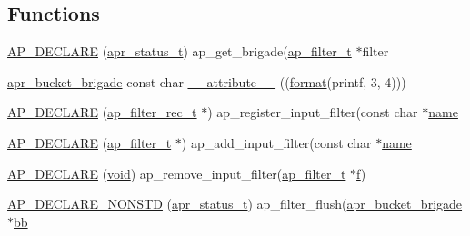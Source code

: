 \subsection*{Functions}
\begin{DoxyCompactItemize}
\item 
\hyperlink{group__APACHE__CORE__FILTER_gacd341cc6652b99c7728a5bda1778427a}{A\+P\+\_\+\+D\+E\+C\+L\+A\+RE} (\hyperlink{group__apr__errno_gaa5105fa83cc322f09382292db8b47593}{apr\+\_\+status\+\_\+t}) ap\+\_\+get\+\_\+brigade(\hyperlink{structap__filter__t}{ap\+\_\+filter\+\_\+t} $\ast$filter
\item 
\hyperlink{structapr__bucket__brigade}{apr\+\_\+bucket\+\_\+brigade} const char \hyperlink{group__APACHE__CORE__FILTER_gaffff87e9d47c8713314a3ca674d67f87}{\+\_\+\+\_\+attribute\+\_\+\+\_\+} ((\hyperlink{group__apr__time_ga6427c3237144d9709aa13825289f0b78}{format}(printf, 3, 4)))
\item 
\hyperlink{group__APACHE__CORE__FILTER_gadf783c020ebfc7202aed1fd6baf321cc}{A\+P\+\_\+\+D\+E\+C\+L\+A\+RE} (\hyperlink{structap__filter__rec__t}{ap\+\_\+filter\+\_\+rec\+\_\+t} $\ast$) ap\+\_\+register\+\_\+input\+\_\+filter(const char $\ast$\hyperlink{pcre_8txt_a5a15d68aadb41c771fe50a27c400d49b}{name}
\item 
\hyperlink{group__APACHE__CORE__FILTER_ga67fb16c1dc6ea7e40ea2649001d60e57}{A\+P\+\_\+\+D\+E\+C\+L\+A\+RE} (\hyperlink{structap__filter__t}{ap\+\_\+filter\+\_\+t} $\ast$) ap\+\_\+add\+\_\+input\+\_\+filter(const char $\ast$\hyperlink{pcre_8txt_a5a15d68aadb41c771fe50a27c400d49b}{name}
\item 
\hyperlink{group__APACHE__CORE__FILTER_ga03dbab8794744bff16b72b6244a083e2}{A\+P\+\_\+\+D\+E\+C\+L\+A\+RE} (\hyperlink{group__MOD__ISAPI_gacd6cdbf73df3d9eed42fa493d9b621a6}{void}) ap\+\_\+remove\+\_\+input\+\_\+filter(\hyperlink{structap__filter__t}{ap\+\_\+filter\+\_\+t} $\ast$\hyperlink{pcregrep_8txt_a588c778c1c1509e472f22dc36efb005e}{f})
\item 
\hyperlink{group__APACHE__CORE__FILTER_ga393e9d5c3f568bbe2455b02688753030}{A\+P\+\_\+\+D\+E\+C\+L\+A\+R\+E\+\_\+\+N\+O\+N\+S\+TD} (\hyperlink{group__apr__errno_gaa5105fa83cc322f09382292db8b47593}{apr\+\_\+status\+\_\+t}) ap\+\_\+filter\+\_\+flush(\hyperlink{structapr__bucket__brigade}{apr\+\_\+bucket\+\_\+brigade} $\ast$\hyperlink{group__MOD__PROXY_ga9313a8a2814cff280d5d780c723def3c}{bb}
\end{DoxyCompactItemize}
